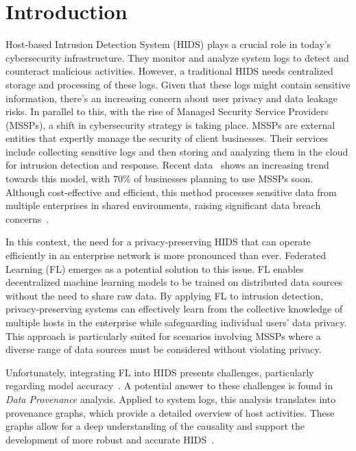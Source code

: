 \section{Introduction}
\label{s:intro}

Host-based Intrusion Detection System (HIDS) plays a crucial role in today's cybersecurity infrastructure. They monitor and analyze system logs to detect and counteract malicious activities. However, a traditional HIDS needs centralized storage and processing of these logs. Given that these logs might contain sensitive information, there's an increasing concern about user privacy and data leakage risks. In parallel to this, with the rise of Managed Security Service Providers (MSSPs), a shift in cybersecurity strategy is taking place. MSSPs are external entities that expertly manage the security of client businesses. Their services include collecting sensitive logs and then storing and analyzing them in the cloud for intrusion detection and response. Recent data~\cite{study-mssp} shows an increasing trend towards this model, with 70\% of businesses planning to use MSSPs soon. Although cost-effective and efficient, this method processes sensitive data from multiple enterprises in shared environments, raising significant data breach concerns~\cite{attack-mssp}.

In this context, the need for a privacy-preserving HIDS that can operate efficiently in an enterprise network is more pronounced than ever. Federated Learning (FL) emerges as a potential solution to this issue. FL enables decentralized machine learning models to be trained on distributed data sources without the need to share raw data. By applying FL to intrusion detection, privacy-preserving systems can effectively learn from the collective knowledge of multiple hosts in the enterprise while safeguarding individual users' data privacy. This approach is particularly suited for scenarios involving MSSPs where a diverse range of data sources must be considered without violating privacy.

Unfortunately, integrating FL into HIDS presents challenges, particularly regarding model accuracy~\cite{bonawitz2019towards}. A potential answer to these challenges is found in \textit{Data Provenance} analysis. Applied to system logs, this analysis translates into provenance graphs, which provide a detailed overview of host activities. These graphs allow for a deep understanding of the causality and support the development of more robust and accurate HIDS~\cite{provdetector2020,rapsheet2020,shadewatcher}.